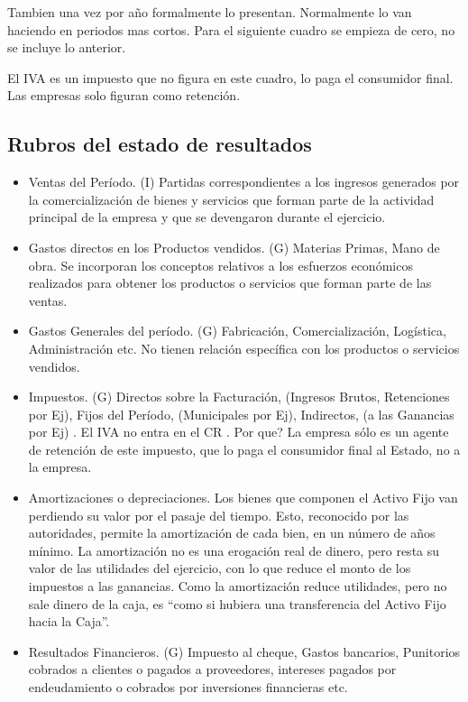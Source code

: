 \documentclass[titlepage,a4paper]{article}
\begin{document}
Tambien una vez por año formalmente lo presentan. Normalmente lo van haciendo en periodos mas cortos. Para el siguiente cuadro se empieza de cero, no se incluye lo anterior.

El IVA es un impuesto que no figura en este cuadro, lo paga el consumidor final. Las empresas solo figuran como retención.

\subsection{Rubros del estado de resultados}
\begin{itemize}
    \item Ventas del Período. (I) Partidas correspondientes a los ingresos generados por la comercialización de
bienes y servicios que forman parte de la actividad principal de la empresa y que se devengaron durante
el ejercicio.
    \item Gastos directos en los Productos vendidos. (G) Materias Primas, Mano de obra. Se incorporan los
conceptos relativos a los esfuerzos económicos realizados para obtener los productos o servicios que
forman parte de las ventas.
    \item Gastos Generales del período. (G) Fabricación, Comercialización, Logística, Administración etc. No tienen
relación específica con los productos o servicios vendidos.
    \item Impuestos. (G) Directos sobre la Facturación, (Ingresos Brutos, Retenciones por Ej), Fijos del Período,
(Municipales por Ej), Indirectos, (a las Ganancias por Ej) . El IVA no entra en el CR . Por que? La empresa
sólo es un agente de retención de este impuesto, que lo paga el consumidor final al Estado, no a la
empresa.
    \item Amortizaciones o depreciaciones. Los bienes que componen el Activo Fijo van perdiendo su valor por el
pasaje del tiempo. Esto, reconocido por las autoridades, permite la amortización de cada bien, en un
número de años mínimo. La amortización no es una erogación real de dinero, pero resta su valor de las
utilidades del ejercicio, con lo que reduce el monto de los impuestos a las ganancias. Como la
amortización reduce utilidades, pero no sale dinero de la caja, es “como si hubiera una transferencia del
Activo Fijo hacia la Caja”.
    \item Resultados Financieros. (G) Impuesto al cheque, Gastos bancarios, Punitorios cobrados a clientes o
pagados a proveedores, intereses pagados por endeudamiento o cobrados por inversiones financieras
etc.
\end{itemize}
\end{document}
